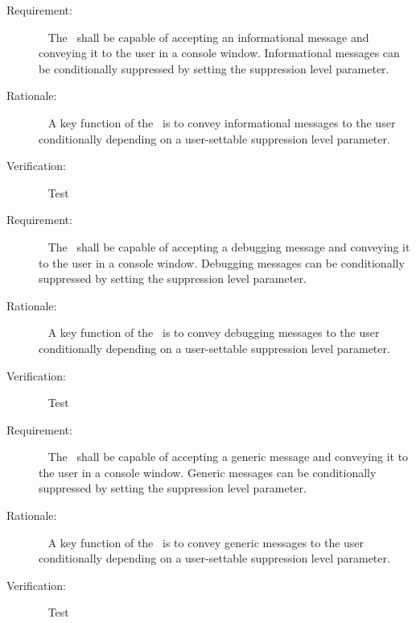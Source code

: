 \label{reqt:INFORM}
\begin{description}
  \item[Requirement:]\ \newline
     The \MessageHandlerDesc\ shall be capable of accepting an informational 
message and conveying it to the user in a console window.  Informational 
messages can be conditionally suppressed by setting the suppression level 
parameter.
  \item[Rationale:]\ \newline
A key function of the \MessageHandlerDesc\ is to convey informational messages 
to the user conditionally depending
on a user-settable suppression level parameter.

  \item[Verification:]\ \newline
    Test
\end{description}

\label{reqt:DEBUG}
\begin{description}
  \item[Requirement:]\ \newline
     The \MessageHandlerDesc\ shall be capable of accepting a debugging 
message and conveying it to the user in a console window.  Debugging 
messages can be conditionally suppressed by setting the suppression level 
parameter.
  \item[Rationale:]\ \newline
A key function of the \MessageHandlerDesc\ is to convey debugging messages 
to the user conditionally depending
on a user-settable suppression level parameter.

  \item[Verification:]\ \newline
    Test
\end{description}

\label{reqt:GENERIC}
\begin{description}
  \item[Requirement:]\ \newline
     The \MessageHandlerDesc\ shall be capable of accepting a generic 
message and conveying it to the user in a console window.  Generic 
messages can be conditionally suppressed by setting the suppression level 
parameter.
  \item[Rationale:]\ \newline
A key function of the \MessageHandlerDesc\ is to convey generic messages 
to the user conditionally depending
on a user-settable suppression level parameter.

  \item[Verification:]\ \newline
    Test
\end{description}
